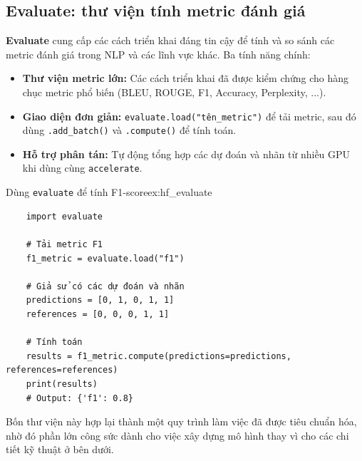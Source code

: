 \subsection{Evaluate: thư viện tính metric đánh giá}
\label{ssec:hf_evaluate}
\textbf{Evaluate} cung cấp các cách triển khai đáng tin cậy để tính và so sánh các metric đánh giá trong NLP và các lĩnh vực khác. Ba tính năng chính:
\begin{itemize}
    \item \textbf{Thư viện metric lớn:} Các cách triển khai đã được kiểm chứng cho hàng chục metric phổ biến (BLEU, ROUGE, F1, Accuracy, Perplexity, ...).
    \item \textbf{Giao diện đơn giản:} \texttt{evaluate.\allowbreak load(\allowbreak "tên\_\allowbreak metric")} để tải metric, sau đó dùng \texttt{.add\_batch()} và \texttt{.compute()} để tính toán.
    \item \textbf{Hỗ trợ phân tán:} Tự động tổng hợp các dự đoán và nhãn từ nhiều GPU khi dùng cùng \texttt{accelerate}.
\end{itemize}
\begin{example}{Dùng \texttt{evaluate} để tính F1-score}{ex:hf_evaluate}
    \begin{verbatim}
    import evaluate

    # Tải metric F1
    f1_metric = evaluate.load("f1")

    # Giả sử có các dự đoán và nhãn
    predictions = [0, 1, 0, 1, 1]
    references = [0, 0, 0, 1, 1]

    # Tính toán
    results = f1_metric.compute(predictions=predictions, references=references)
    print(results)
    # Output: {'f1': 0.8}
    \end{verbatim}
\end{example}

Bốn thư viện này hợp lại thành một quy trình làm việc đã được tiêu chuẩn hóa, nhờ đó phần lớn công sức dành cho việc xây dựng mô hình thay vì cho các chi tiết kỹ thuật ở bên dưới.